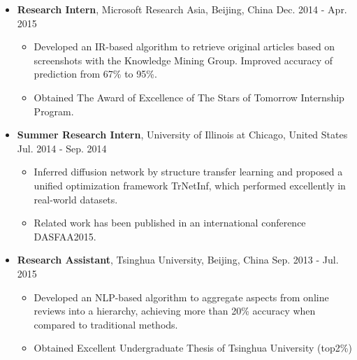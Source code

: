 \documentclass[11pt]{article}
\begin{document}
\begin{CJK}{GBK}{kai}
\begin{itemize}
   \item \textbf{Research Intern}, Microsoft Research Asia, Beijing, China \hfill Dec. 2014 - Apr. 2015\\
     \begin{itemize}
     \item Developed an IR-based algorithm to retrieve original articles based on screenshots with the Knowledge Mining Group. Improved accuracy of prediction from 67\% to 95\%.
     \item Obtained The Award of Excellence of The Stars of Tomorrow Internship Program.\\\medskip
     \end{itemize}

   \item \textbf{Summer Research Intern}, University of Illinois at Chicago, United States \hfill Jul. 2014 - Sep. 2014\\
     \begin{itemize}
     \item Inferred diffusion network  by structure transfer learning and proposed a unified optimization framework TrNetInf, which performed excellently in real-world datasets.
     \item Related work has been published in an international conference DASFAA2015. \\\medskip
     \end{itemize}
  
   \item \textbf{Research Assistant}, Tsinghua University, Beijing, China \hfill Sep. 2013 - Jul. 2015\\
     \begin{itemize}
     \item Developed an NLP-based algorithm to aggregate aspects from online reviews into a hierarchy, achieving more than 20\% accuracy when compared to traditional methods. 
     \item Obtained Excellent Undergraduate Thesis of Tsinghua University (top2\%)
     \end{itemize}
\end{itemize}

\bigskip


\end{CJK}
\end{document}
